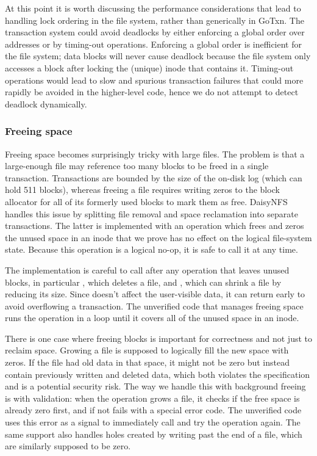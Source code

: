 At this point it is worth discussing the performance considerations that lead to
handling lock ordering in the file
system, rather than generically in GoTxn. The transaction system could
avoid deadlocks by either enforcing a global order over addresses or by
timing-out operations. Enforcing a global order is inefficient for the file
system; data blocks will never cause deadlock because the file system only
accesses a block after locking the (unique) inode that contains it. Timing-out
operations would lead to slow and spurious transaction failures that could more
rapidly be avoided in the higher-level code, hence we do not attempt to detect
deadlock dynamically.


\subsubsection{Freeing space}
\label{sec:dafny:freeing}

Freeing space becomes surprisingly tricky with large files. The problem is that
a large-enough file may reference too many blocks to be
freed in a single transaction. Transactions are bounded by the size of the
on-disk log (which can hold 511 blocks), whereas freeing a file requires
writing zeros to the block allocator for all of its formerly used blocks to mark them as free.
DaisyNFS handles this issue by splitting file removal and space reclamation
into separate transactions. The latter is implemented with an operation
 which frees and zeros the unused space in an inode that
we prove has no effect on the logical file-system state. Because this operation is a
logical no-op, it is safe to call it at any time.

The implementation is careful to call  after any operation
that leaves unused blocks, in particular , which deletes a file, and
, which can shrink a file by reducing its size. Since
 doesn't affect the user-visible data, it can return early to
avoid overflowing a transaction. The unverified code that manages freeing space
runs the operation in a loop until it covers all of the unused space in an
inode.

There is one case where freeing blocks is important for correctness and not just
to reclaim space. Growing a file is supposed to logically fill the new space
with zeros. If the file had old data in that space, it might not be zero but
instead contain previously written and deleted data, which both violates the specification and
is a potential security risk. The way we handle this with background freeing is
with validation: when the  operation grows a file, it checks if the
free space is already zero first, and if not fails with a special error code. The
unverified code uses this error as a signal to immediately call
 and try the operation again. The same support also handles
holes created by writing past the end of a file, which are similarly supposed to
be zero.

